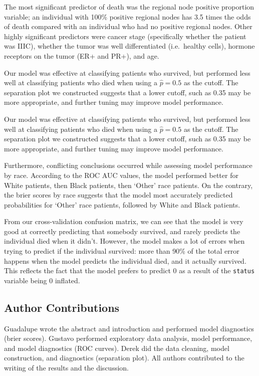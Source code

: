 \documentclass[
]{article}
\begin{document}
The most significant predictor of death was the regional node positive
proportion variable; an individual with 100\% positive regional nodes
has 3.5 times the odds of death compared with an individual who had no
positive regional nodes. Other highly significant predictors were cancer
stage (specifically whether the patient was IIIC), whether the tumor was
well differentiated (i.e.~healthy cells), hormone receptors on the tumor
(ER+ and PR+), and age.

Our model was effective at classifying patients who survived, but
performed less well at classifying patients who died when using a
\(\hat{p}=0.5\) as the cutoff. The separation plot we constructed
suggests that a lower cutoff, such as 0.35 may be more appropriate, and
further tuning may improve model performance.

Our model was effective at classifying patients who survived, but
performed less well at classifying patients who died when using a
\(\hat{p}=0.5\) as the cutoff. The separation plot we constructed
suggests that a lower cutoff, such as 0.35 may be more appropriate, and
further tuning may improve model performance.

Furthermore, conflicting conclusions occurred while assessing model
performance by race. According to the ROC AUC values, the model
performed better for White patients, then Black patients, then `Other'
race patients. On the contrary, the brier scores by race suggests that
the model most accurately predicted probabilities for `Other' race
patients, followed by White and Black patients.

From our cross-validation confusion matrix, we can see that the model is
very good at correctly predicting that somebody survived, and rarely
predicts the individual died when it didn't. However, the model makes a
lot of errors when trying to predict if the individual survived: more
than 90\% of the total error happens when the model predicts the
individual died, and it actually survived. This reflects the fact that
the model prefers to predict 0 as a result of the \texttt{status}
variable being 0 inflated.

\hypertarget{author-contributions}{%
\subsection{Author Contributions}\label{author-contributions}}

Guadalupe wrote the abstract and introduction and performed model
diagnostics (brier scores). Gustavo performed exploratory data analysis,
model performance, and model diagnostics (ROC curves). Derek did the
data cleaning, model construction, and diagnostics (separation plot).
All authors contributed to the writing of the results and the
discussion.
\end{document}
